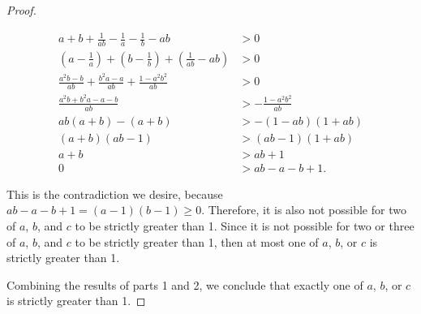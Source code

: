 \documentclass{article}
\begin{document}
\begin{proof}
\begin{enumerate}
    \begin{align*}
      a + b + \frac{1}{ab} - \frac{1}{a} - \frac{1}{b} - ab &> 0 \\
      \left(a - \frac{1}{a}\right) + \left(b - \frac{1}{b}\right) + \left(\frac{1}{ab} - ab\right) &> 0\\
      \frac{a^2b - b}{ab} + \frac{b^2a - a}{ab} + \frac{1 - a^2b^2}{ab} &> 0\\
      \frac{a^2b + b^2a - a - b}{ab} &> -\frac{1 - a^2b^2}{ab}\\
      ab(a + b) - (a + b) &> -(1 - ab)(1 + ab)\\
      (a + b)(ab - 1) &> (ab - 1)(1 + ab)\\
      a + b &> ab + 1 \\
      0 &> ab - a - b + 1.
    \end{align*}

    This is the contradiction we desire, because $ab - a - b + 1 = (a - 1)(b - 1) \geq 0$. Therefore, it is also not possible for two of $a$, $b$, and $c$ to be strictly greater than 1. Since it is not possible for two or three of $a$, $b$, and $c$ to be strictly greater than 1, then at most one of $a$, $b$, or $c$ is strictly greater than 1.

\end{enumerate}

Combining the results of parts 1 and 2, we conclude that exactly one of $a$, $b$, or $c$ is strictly greater than 1.
  
\end{proof}
\end{document}

